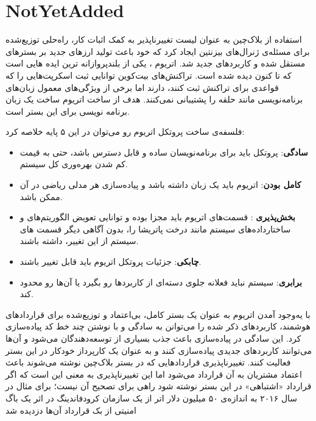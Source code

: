 \section{NotYetAdded}
\par
استفاده از بلاک‌چین به عنوان لیست تغییرناپذیر به کمک اثبات کار، راه‌حلی توزیع‌شده برای مسئله‌ی ژنرال‌های بیزنتین 
 ایجاد کرد که خود باعث تولید ارزهای جدید بر بسترهای مستقل شده و کاربردهای جدید شد. 
  اتریوم
\cite{Ethereum}،
یکی از بلندپروازانه ترین ایده هایی است که تا کنون دیده شده
 است. تراکنش‌های بیت‌کوین توانایی ثبت اسکرپت‌هایی را که قواعدی برای تراکنش ثبت کنند، دارند اما برخی از ویژگی‌های معمول زبان‌های برنامه‌نویسی
 مانند حلقه را پشتیبانی نمی‌کنند. هدف از ساخت اتریوم ساخت یک زبان برنامه نویسی
 برای این بستر است. 
\par
فلسفه‌ی ساخت پروتکل اتریوم رو می‌توان در این ۵ پایه خلاصه کرد: 
\begin{itemize}
	\item \textbf{سادگی}:
 پروتکل باید برای برنامه‌نویسان ساده و قابل دسترس باشد، حتی به قیمت کم شدن بهره‌وری کل سیستم.
\item  \textbf{کامل‌ بودن}:
اتریوم باید یک زبان
  داشته باشد و پیاده‌سازی هر مدلی ریاضی در آن ممکن باشد. 
\item \textbf{بخش‌پذیری} :
قسمت‌های اتریوم باید مجزا بوده و توانایی تعویض الگوریتم‌های و ساختارداده‌های سیستم مانند درخت پاتریشا را، بدون آگاهی دیگر قسمت های سیستم از این تغییر، داشته باشند.
\item \textbf{چابکی}:
 جزئیات پروتکل اتریوم باید قابل تغییر باشند. 
\item \textbf{برابری}:
سیستم نباید فعلانه جلوی دسته‌ای از کاربردها رو بگیرد یا آن‌ها رو محدود کند.
\end{itemize}
\par
با یه‌وجود آمدن اتریوم به عنوان یک بستر کامل، بی‌اعتماد و توزیع‌شده برای قرارداد‌های هوشمند، کاربرد‌های ذکر شده را می‌توانن به سادگی و با نوشتن چند خط کد پیاده‌سازی کرد. این سادگی در پیاده‌سازی باعث جذب بسیاری از توسعه‌دهندگان می‌شود و آن‌ها می‌توانند کاربردهای جدیدی پیاده‌‌سازی کنند و به عنوان یک کارپرداز خودکار در این بستر فعالیت کنند. تغییرناپذیری قرارداد‌هایی که در بستر بلاک‌چین نوشته می‌شوند باعث اعتماد مشتریان به آن قرارداد می‌شود اما این تغییرناپذیری به معنی این است که اگر قرارداد «اشتباهی» در این بستر نوشته شود راهی برای تصحیح آن نیست؛ برای مثال در سال ۲۰۱۶ به اندازه‌ی ۵۰ میلیون دلار اتر از یک سازمان کرودفاندینگ در اثر یک باگ امنیتی از بک قرارداد آن‌ها دزدیده شد
